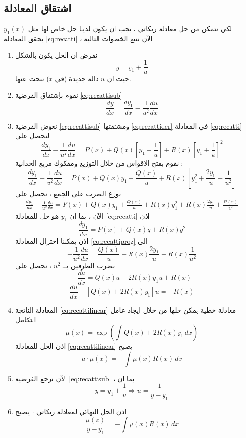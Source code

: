 \subsection*{اشتقاق المعادلة}
لكي نتمكن من حل معادلة ريكاتي ، يجب ان يكون لدينا حل خاص لها مثل $y_1(x)$ يحقق المعادلة \eqref{eq:recatti} ، الآن نتبع الخطوات التالية
\begin{enumerate}[label=$\bullet$]
	\item نفرض ان الحل يكون بالشكل 
	\begin{equation}
		\label{eq:recattisub}
		y = y_1 + \frac{1}{u}
	\end{equation}
	حيث ان 
	$u$ دالة جديدة (في $x$) نبحث عنها.
	\item نقوم بإشتقاق الفرضية \eqref{eq:recattisub}
	\begin{equation}
		\label{eq:recattider}
		\frac{dy}{dx} = \frac{dy_1}{dx} - \frac{1}{u^2} \frac{du}{dx}
	\end{equation}
	\item نعوض الفرضية \eqref{eq:recattisub} ومشتقتها \eqref{eq:recattider} في المعادلة \eqref{eq:recatti} لنحصل على
	\[
	\frac{dy_1}{dx} - \frac{1}{u^2} \frac{du}{dx} = P(x) + Q(x) \left[y_1 + \frac{1}{u}\right] + R(x) \left[y_1 + \frac{1}{u}\right]^2
	\]
	نقوم بفتح الاقواس من خلال التوزيع ومفكوك مربع الحدانية :
	\[
	\frac{dy_1}{dx} - \frac{1}{u^2} \frac{du}{dx} = P(x) + Q(x) y_1 + \frac{Q(x)}{u} + R(x) \left[y_1^2 + \frac{2y_1}{u} + \frac{1}{u^2}\right]
	\]
	نوزع الضرب على الجمع ، نحصل على 
	\begin{equation}
		\label{eq:recattiprog}
		\begin{split}
		\frac{dy_1}{dx} - \frac{1}{u^2} \frac{du}{dx} = P(x) + Q(x) y_1 + \frac{Q(x)}{u}+ R(x) y_1^2 + R(x)\frac{2y_1}{u} + \frac{R(x)}{u^2}
		\end{split}
	\end{equation}
	الآن ، بما ان $y_1 $ هو حل للمعادلة \eqref{eq:recatti} اذن
	\[
	\frac{dy_1}{dx} = P(x) + Q(x) y + R(x) y^2
	\]
	اذن يمكننا اختزال المعادلة \eqref{eq:recattiprog} الى
	\[
	- \frac{1}{u^2} \frac{du}{dx} =  \frac{Q(x)}{u}  + R(x)\frac{2y_1}{u} + R(x)\frac{1}{u^2}
	\]
	بضرب الطرفين بــ $u^2 $ ، نحصل على 
	\[
	- \frac{du}{dx} = Q(x) u + 2R(x)y_1 u + R(x)
	\]
	\begin{equation}
		\label{eq:recattilinear}
		\frac{du}{dx} + [Q(x) + 2R(x)y_1] u = -R(x)
	\end{equation}
	
	\item المعادلة الناتجة \eqref{eq:recattilinear} معادلة خطية يمكن حلها من خلال ايجاد عامل التكامل 
	\[
	\mu(x) = \exp \left(\int Q(x) + 2R(x) y_1 \, dx\right)
	\]
	اذن الحل للمعادلة \eqref{eq:recattilinear} يصبح
	\[
	u\cdot \mu(x) = - \int \mu(x) R(x) \,dx
	\]
	\item الآن نرجع الفرضية \eqref{eq:recattisub} ، بما ان
	\[
	y = y_1 + \frac{1}{u} \Rightarrow u = \frac{1}{y-y_1}
	\]
	\item اذن الحل النهائي لمعادلة ريكاتي ، يصبح
	\[
	\frac{\mu(x)}{y-y_1} = - \int \mu(x) R(x) \,dx
	\]
\end{enumerate}

